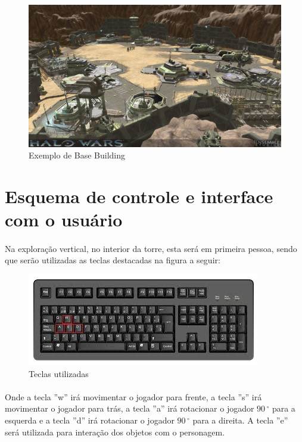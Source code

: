 \documentclass[11pt]{article} %
\begin{document}
\begin{figure}[!htp]
\centering
\includegraphics[scale=0.3]{res/base_building.png}
\caption{Exemplo de Base Building}
\label{Exemplo de Base Building}
\end{figure}

\section{Esquema de controle e interface com o usuário}

\paragraph{}Na exploração vertical, no interior da torre, esta será em primeira pessoa, sendo que serão utilizadas as teclas destacadas na figura a seguir:\\

\begin{figure}[!htp]
\centering
\includegraphics[scale=0.75]{res/keyboard.jpg}
\caption{Teclas utilizadas}
\label{Teclado}
\end{figure}

\paragraph{}Onde a tecla ''w'' irá movimentar o jogador para frente, a tecla ''s'' irá movimentar o jogador para trás, a tecla ''a'' irá rotacionar o jogador $90\,^{\circ}$ para a esquerda e a tecla ''d'' irá rotacionar o jogador $90\,^{\circ}$ para a direita. A tecla ''e'' será utilizada para interação dos objetos com o personagem.
\end{document}
